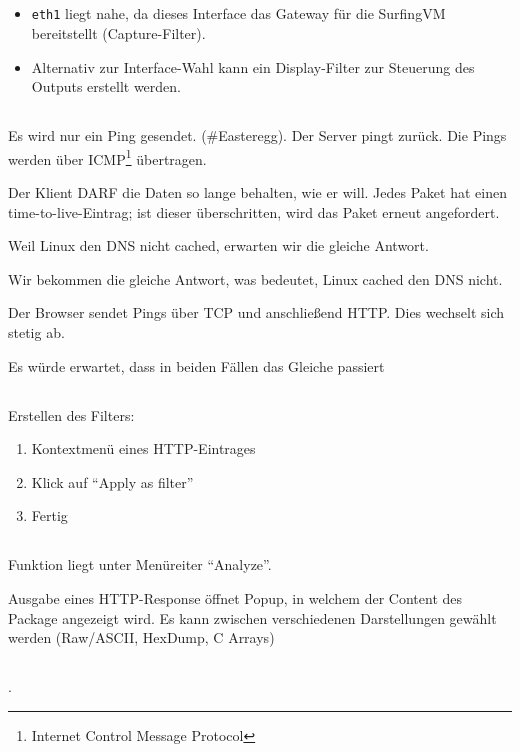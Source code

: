\documentclass[twoside]{article}
\newcommand{\ttt}[1]{%
	\texttt{#1}%
}
\begin{document}
\subsection{}
\begin{itemize}
	\item \ttt{eth1} liegt nahe, da dieses Interface das Gateway für die SurfingVM bereitstellt (Capture-Filter).
	\item Alternativ zur Interface-Wahl kann ein Display-Filter zur Steuerung des Outputs erstellt werden.
\end{itemize}
\subsection{}
Es wird nur ein Ping gesendet. (\#Easteregg).
Der Server pingt zurück.
Die Pings werden über ICMP\footnote{Internet Control Message Protocol} übertragen.

Der Klient DARF die Daten so lange behalten, wie er will.
Jedes Paket hat einen time-to-live-Eintrag; ist dieser überschritten, wird das Paket erneut angefordert.

Weil Linux den DNS nicht cached, erwarten wir die gleiche Antwort.

Wir bekommen die gleiche Antwort, was bedeutet, Linux cached den DNS nicht.

Der Browser sendet Pings über TCP und anschließend HTTP.
Dies wechselt sich stetig ab.

Es würde erwartet, dass in beiden Fällen das Gleiche passiert
\subsection{}
Erstellen des Filters:
\begin{enumerate}
	\item Kontextmenü eines HTTP-Eintrages
	\item Klick auf ``Apply as filter''
	\item Fertig
\end{enumerate}
\subsection{}
Funktion liegt unter Menüreiter ``Analyze''.

Ausgabe eines HTTP-Response öffnet Popup, in welchem der Content des Package angezeigt wird.
Es kann zwischen verschiedenen Darstellungen gewählt werden (Raw/ASCII, HexDump, C Arrays)
\subsection{}.
\end{document}
